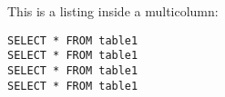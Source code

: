 \documentclass{article}
\begin{document}
\begin{multicols}{2}
	This is a listing inside a multicolumn:

	\begin{verbatim}
SELECT * FROM table1
SELECT * FROM table1
SELECT * FROM table1
SELECT * FROM table1
	\end{verbatim}
	\label{lst:sql}
\end{multicols}
\end{document}
